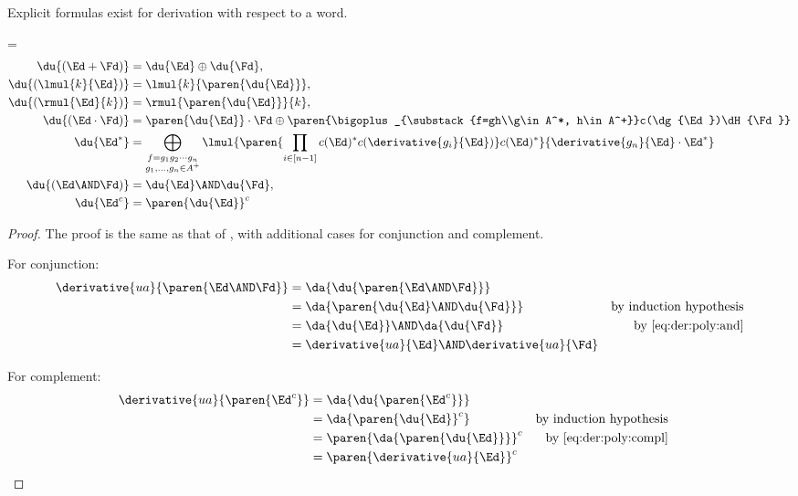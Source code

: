 \documentclass[a4paper,USenglish]{lipics}
\begin{document}
Explicit formulas exist for derivation with respect to a word.
\begin{Lemma}
  \abovedisplayskip=\abovedisplayshortskip
  \label{lem:der:word}
  \begin{align}
    \du{(\Ed + \Fd)} &= \du{\Ed} \oplus \du{\Fd},
    \\
    \du{(\lmul{k}{\Ed})} &= \lmul{k}{\paren{\du{\Ed}}},
    \\
    \du{(\rmul{\Ed}{k})} &= \rmul{\paren{\du{\Ed}}}{k},
    \\
    \du{(\Ed \cdot \Fd)} &= \paren{\du{\Ed}} \cdot \Fd \oplus \paren{\bigoplus_{\substack{f=gh\\g\in A^*, h\in A^+}}c(\dg{\Ed})\dH{\Fd}}
    \\
    \du{\Ed^*}
    &= \bigoplus_{\substack{f=g_1g_2\cdots g_n\\g_1,\ldots, g_n\in A^+}}
      \lmul{\paren{\prod_{i\in [n-1]}c(\Ed)^* c(\derivative{g_i}{\Ed})}c(\Ed)^*}{\derivative{g_n}{\Ed}\cdot\Ed^*}
    \\
    \label{eq:der:word:and}
    \du{(\Ed \AND \Fd)} &= \du{\Ed} \AND \du{\Fd},
    \\
    \label{eq:der:word:compl}
    \du{\Ed^c} &= \paren{\du{\Ed}}^{c}
  \end{align}
\end{Lemma}

\begin{proof}
  The proof is the same as that of \citep[Prop.~3]{lombardy.2005.tcs}, with
  additional cases for conjunction and complement.

  For conjunction:
  \begin{align*}
    \derivative{ua}{\paren{\Ed \AND \Fd}}
    &= \da{\du{\paren{\Ed \AND \Fd}}} \\
    &= \da{\paren{\du{\Ed} \AND \du{\Fd}}} & \text{by induction hypothesis}\\
    &= \da{\du{\Ed}} \AND \da{\du{\Fd}} & \text{by \cref{eq:der:poly:and}} \\
    &= \derivative{ua}{\Ed} \AND \derivative{ua}{\Fd}
  \end{align*}

  For complement:
  \begin{align*}
    \derivative{ua}{\paren{\Ed^c}}
    &= \da{\du{\paren{\Ed^c}}} \\
    &= \da{\paren{\du{\Ed}}^c} & \text{by induction hypothesis} \\
    &= \paren{\da{\paren{\du{\Ed}}}}^c & \text{by \cref{eq:der:poly:compl}} \\
    &= \paren{\derivative{ua}{\Ed}}^ c
    && \hfill\qedhere
  \end{align*}
\end{proof}
\end{document}

